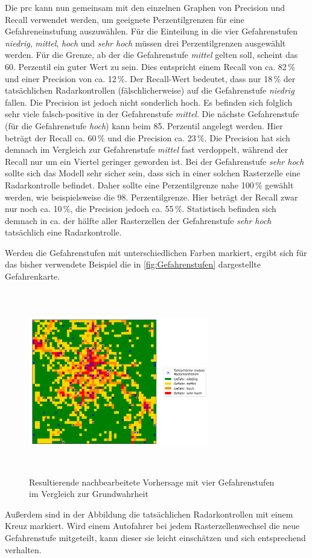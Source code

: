 Die \acrshort{prc} kann nun gemeinsam mit den einzelnen Graphen von Precision und Recall verwendet werden, um geeignete Perzentilgrenzen für eine Gefahreneinstufung auszuwählen.
Für die Einteilung in die vier Gefahrenstufen \emph{niedrig}, \emph{mittel}, \emph{hoch} und \emph{sehr hoch} müssen drei Perzentilgrenzen ausgewählt werden.
Für die Grenze, ab der die Gefahrenstufe \emph{mittel} gelten soll, scheint das 60. Perzentil ein guter Wert zu sein.
Dies entspricht einem Recall von ca. 82\,\% und einer Precision von ca. 12\,\%.
Der Recall-Wert bedeutet, dass nur 18\,\% der tatsächlichen Radarkontrollen (fälschlicherweise) auf die Gefahrenstufe \emph{niedrig} fallen.
Die Precision ist jedoch nicht sonderlich hoch.
Es befinden sich folglich sehr viele falsch-positive in der Gefahrenstufe \emph{mittel}.
Die nächste Gefahrenstufe (für die Gefahrenstufe \emph{hoch}) kann beim 85. Perzentil angelegt werden.
Hier beträgt der Recall ca. 60\,\% und die Precision ca. 23\,\%.
Die Precision hat sich demnach im Vergleich zur Gefahrenstufe \emph{mittel} fast verdoppelt, während der Recall nur um ein Viertel geringer geworden ist.
Bei der Gefahrenstufe \emph{sehr hoch} sollte sich das Modell sehr sicher sein, dass sich in einer solchen Rasterzelle eine Radarkontrolle befindet.
Daher sollte eine Perzentilgrenze nahe 100\,\% gewählt werden, wie beispielsweise die 98. Perzentilgrenze.
Hier beträgt der Recall zwar nur noch ca. 10\,\%, die Precision jedoch ca. 55\,\%.
Statistisch befinden sich demnach in ca. der hälfte aller Rasterzellen der Gefahrenstufe \emph{sehr hoch} tatsächlich eine Radarkontrolle.

Werden die Gefahrenstufen mit unterschiedlichen Farben markiert, ergibt sich für das bisher verwendete Beispiel die in \autoref{fig:Gefahrenstufen} dargestellte Gefahrenkarte.

\begin{figure}[h]
    \centering
    \includegraphics[width=0.7\textwidth,height=8cm,keepaspectratio=true]{content/images/Gefahrenstufen.png}
    \caption{Resultierende nachbearbeitete Vorhersage mit vier Gefahrenstufen im Vergleich zur Grundwahrheit}
    \label{fig:Gefahrenstufen}
\end{figure}

Außerdem sind in der Abbildung die tatsächlichen Radarkontrollen mit einem Kreuz markiert.
Wird einem Autofahrer bei jedem Rasterzellenwechsel die neue Gefahrenstufe mitgeteilt, kann dieser sie leicht einschätzen und sich entsprechend verhalten.

